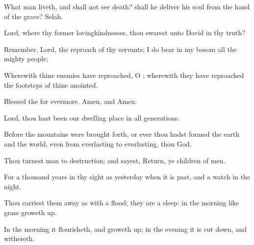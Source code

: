 {\par }{\Q {}What
man
{}
liveth, and shall not
see
death? shall he
deliver his
soul from the
hand of the
grave?
Selah.


\par }{\Q {}Lord, where
{} thy
former
lovingkindnesses,
{} thou
swarest unto
David in thy
truth?


\par }{\Q {}Remember,
Lord, the
reproach of thy
servants;
{} I do
bear in my
bosom
{} all the
mighty
people;


\par }{\Q {}Wherewith thine
enemies have
reproached, O
{}; wherewith they have
reproached the
footsteps of thine
anointed.


\par }{\Q {}Blessed
{} the
{} for
evermore.
Amen, and
Amen.




\par }
{\Q {}Lord, thou hast been our dwelling
place in
all
generations.


\par }{\Q {}Before the
mountains were brought
forth, or ever thou hadst
formed the
earth and the
world, even from
everlasting
to
everlasting, thou
{}
God.


\par }{\Q {}Thou
turnest
man to
destruction; and
sayest,
Return, ye
children of
men.


\par }{\Q {}For a
thousand
years in thy
sight
{}
as
yesterday when it is
past, and
{} a
watch in the
night.


\par }{\Q {}Thou carriest them away as with a
flood; they are
{} a
sleep: in the
morning
{} like
grass
{} groweth
up.


\par }{\Q {}In the
morning it
flourisheth, and groweth
up; in the
evening it is cut
down, and
withereth.


\par }{\BB \par }
